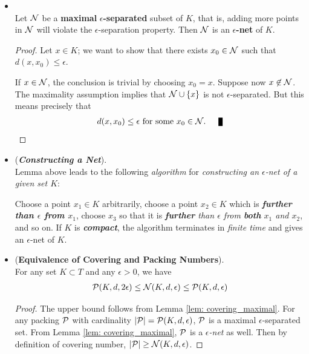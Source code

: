 \documentclass[11pt]{article}
\begin{document}
\begin{itemize}
\item \begin{lemma} \label{lem: covering_maximal}\citep{vershynin2018high}\\
Let ${\mathcal N}$ be a \textbf{maximal} \textbf{$\epsilon$-separated} subset of $K$, that is, adding more points in ${\mathcal N}$ will violate the $\epsilon$-separation property. Then ${\mathcal N}$ is an \textbf{$\epsilon$-net} of $K$.
\end{lemma}
\begin{proof} 
Let $x \in K$; we want to show that there exists $x_0 \in {\mathcal N}$ such that $d(x, x_0) \le \epsilon$.

If $x \in {\mathcal N}$, the conclusion is trivial by choosing $x_0 = x$. Suppose now $x \not\in {\mathcal N}$. The maximality assumption implies that  ${\mathcal N} \cup \left\{x\right\}$ is not $\epsilon$-separated. But this means precisely that 
\begin{align*}
d(x, x_0) \le \epsilon \text{ for some }x_0 \in \cN. \qed
\end{align*}
\end{proof}

\item \begin{remark} (\textbf{\emph{Constructing a Net}}). \citep{vershynin2018high}\\
Lemma above leads to the following  \emph{algorithm} for \emph{constructing an $\epsilon$-net of a given set $K$}:

Choose a point $x_1 \in K$ arbitrarily, choose a point $x_2 \in K$ which is \emph{\textbf{further than $\epsilon$ from $x_1$}}, choose $x_3$ so
that it is \emph{\textbf{further} than $\epsilon$ from \textbf{both} $x_1$ and $x_2$}, and so on. If $K$ is \emph{\textbf{compact}}, the algorithm terminates in \emph{finite time} and gives an $\epsilon$-net of $K$.
\end{remark}

\item \begin{lemma} (\textbf{Equivalence of Covering and Packing Numbers}). \citep{vershynin2018high, wainwright2019high}\\
For any set $K \subset T$ and any  $\epsilon > 0$, we have
\begin{align}
{\mathcal P}(K, d,  2\epsilon) \le {\mathcal N}(K, d, \epsilon) \le {\mathcal P}(K, d,  \epsilon)\label{ineqn: covering_number_packing_number}
\end{align}
\end{lemma}
\begin{proof} The upper bound follows from Lemma \ref{lem: covering_maximal}. For any packing ${\mathcal P}$ with cardinality $\left\lvert {\mathcal P} \right\rvert = {\mathcal P}(K, d,  \epsilon)$, ${\mathcal P}$ is a maximal $\epsilon$-separated set. From Lemma \ref{lem: covering_maximal}, ${\mathcal P}$ is a \emph{$\epsilon$-net} as well. Then by definition of covering number, $\left\lvert {\mathcal P} \right\rvert \ge {\mathcal N}(K, d, \epsilon)$.


\end{proof}
\end{itemize}
\end{document}

